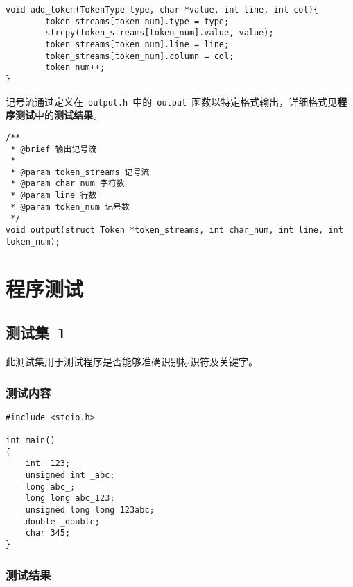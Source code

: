 \documentclass[lang=cn,11pt,a4paper]{paper}
\begin{document}
\begin{lstlisting}
void add_token(TokenType type, char *value, int line, int col){
		token_streams[token_num].type = type;
		strcpy(token_streams[token_num].value, value);
		token_streams[token_num].line = line;
		token_streams[token_num].column = col;
		token_num++;
}
\end{lstlisting}

记号流通过定义在\ \lstinline{output.h}\ 中的\ \lstinline{output}\ 函数以特定格式输出，详细格式见\textbf{程序测试}中的\textbf{测试结果}。

\begin{lstlisting}
/**
 * @brief 输出记号流
 * 
 * @param token_streams 记号流 
 * @param char_num 字符数
 * @param line 行数
 * @param token_num 记号数 
 */
void output(struct Token *token_streams, int char_num, int line, int token_num);
\end{lstlisting}

\section{程序测试}

\subsection{测试集\ 1}

此测试集用于测试程序是否能够准确识别标识符及关键字。

\subsubsection{测试内容}

\begin{lstlisting}
#include <stdio.h>

int main()
{
    int _123;
    unsigned int _abc;
    long abc_;
    long long abc_123;
    unsigned long long 123abc;
    double _double;
    char 345;
}
\end{lstlisting}

\subsubsection{测试结果}
\end{document}

